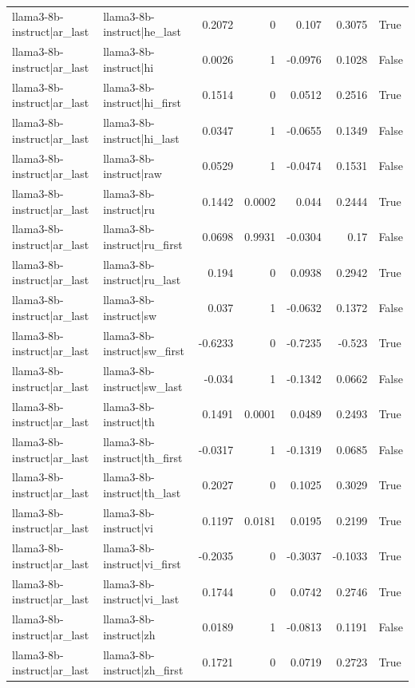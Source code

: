 \begin{table}
\begin{tabular}{l l r r r r l}
llama3-8b-instruct|ar_last & llama3-8b-instruct|he_last & 0.2072 & 0 & 0.107 & 0.3075 & True \\
llama3-8b-instruct|ar_last & llama3-8b-instruct|hi & 0.0026 & 1 & -0.0976 & 0.1028 & False \\
llama3-8b-instruct|ar_last & llama3-8b-instruct|hi_first & 0.1514 & 0 & 0.0512 & 0.2516 & True \\
llama3-8b-instruct|ar_last & llama3-8b-instruct|hi_last & 0.0347 & 1 & -0.0655 & 0.1349 & False \\
llama3-8b-instruct|ar_last & llama3-8b-instruct|raw & 0.0529 & 1 & -0.0474 & 0.1531 & False \\
llama3-8b-instruct|ar_last & llama3-8b-instruct|ru & 0.1442 & 0.0002 & 0.044 & 0.2444 & True \\
llama3-8b-instruct|ar_last & llama3-8b-instruct|ru_first & 0.0698 & 0.9931 & -0.0304 & 0.17 & False \\
llama3-8b-instruct|ar_last & llama3-8b-instruct|ru_last & 0.194 & 0 & 0.0938 & 0.2942 & True \\
llama3-8b-instruct|ar_last & llama3-8b-instruct|sw & 0.037 & 1 & -0.0632 & 0.1372 & False \\
llama3-8b-instruct|ar_last & llama3-8b-instruct|sw_first & -0.6233 & 0 & -0.7235 & -0.523 & True \\
llama3-8b-instruct|ar_last & llama3-8b-instruct|sw_last & -0.034 & 1 & -0.1342 & 0.0662 & False \\
llama3-8b-instruct|ar_last & llama3-8b-instruct|th & 0.1491 & 0.0001 & 0.0489 & 0.2493 & True \\
llama3-8b-instruct|ar_last & llama3-8b-instruct|th_first & -0.0317 & 1 & -0.1319 & 0.0685 & False \\
llama3-8b-instruct|ar_last & llama3-8b-instruct|th_last & 0.2027 & 0 & 0.1025 & 0.3029 & True \\
llama3-8b-instruct|ar_last & llama3-8b-instruct|vi & 0.1197 & 0.0181 & 0.0195 & 0.2199 & True \\
llama3-8b-instruct|ar_last & llama3-8b-instruct|vi_first & -0.2035 & 0 & -0.3037 & -0.1033 & True \\
llama3-8b-instruct|ar_last & llama3-8b-instruct|vi_last & 0.1744 & 0 & 0.0742 & 0.2746 & True \\
llama3-8b-instruct|ar_last & llama3-8b-instruct|zh & 0.0189 & 1 & -0.0813 & 0.1191 & False \\
llama3-8b-instruct|ar_last & llama3-8b-instruct|zh_first & 0.1721 & 0 & 0.0719 & 0.2723 & True \\

\end{tabular}
\end{table}

